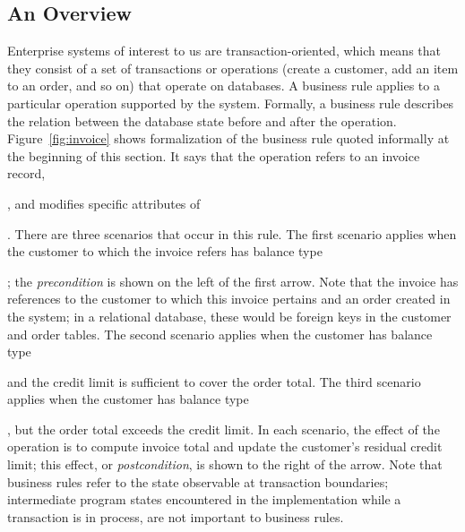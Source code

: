 
\subsection{An Overview}

Enterprise systems of interest to us are transaction-oriented, which means that
they consist of a set of transactions or operations (\eg create a customer, add
an item to an order, and so on) that operate on databases.  A business rule
applies to a particular operation supported by the system.  Formally, a business
rule describes the relation between the database state before and after the
operation.  Figure~\ref{fig:invoice} shows formalization of the business rule
quoted informally at the beginning of this section.  It says that the operation
refers to an invoice record, \subject{inv}, and modifies specific attributes of
\subject{inv}.  There are three scenarios that occur in this rule.  The first
scenario applies when the customer to which the invoice refers has balance type
\subject{None}; the \textit{precondition} is shown on the left of the first
arrow.  Note that the invoice has references to the customer to which this
invoice pertains and an order created in the system; in a relational database,
these would be foreign keys in the customer and order tables.  The second
scenario applies when the customer has balance type \subject{Credit} and the
credit limit is sufficient to cover the order total.  The third scenario applies
when the customer has balance type \subject{Credit}, but the order total exceeds
the credit limit.  In each scenario, the effect of the operation is to compute
invoice total and update the customer's residual credit limit; this effect, or
\textit{postcondition}, is shown to the right of the arrow.  Note that business
rules refer to the state observable at transaction boundaries; intermediate
program states encountered in the implementation while a transaction is in
process, are not important to business rules.

